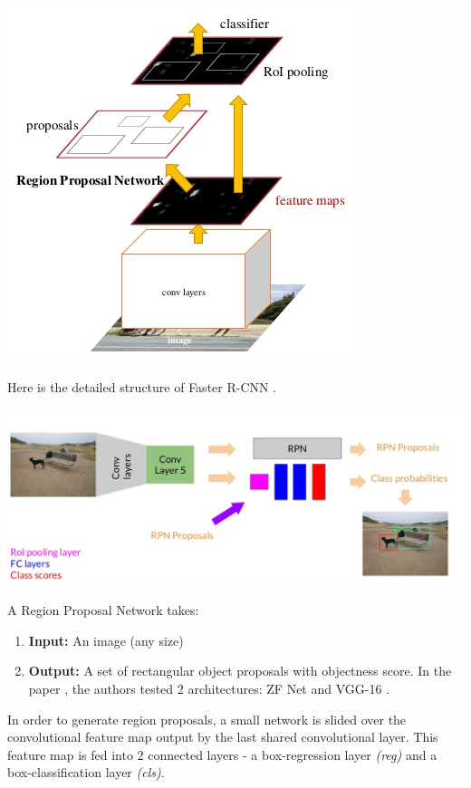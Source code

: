 \documentclass{article}
\begin{document}
\begin{center}
	\includegraphics[scale=0.5]{faster_rcnn}
\end{center}

Here is the detailed structure of Faster R-CNN \cite{slides/faster-rcnn}.

\begin{center}
	\includegraphics[scale=0.3]{faster_rcnn_detail}
\end{center}

A Region Proposal Network takes:
\begin{enumerate}
	\item \textbf{Input:} An image (any size)
	\item \textbf{Output: } A set of rectangular object proposals with objectness score. In the paper \cite{arxiv/faster-rcnn}, the authors tested 2 architectures: ZF Net \cite{arxiv/zfnet} and VGG-16 \cite{arxiv/vgg16}.
\end{enumerate}

In order to generate region proposals, a small network is slided over the convolutional feature map output by the last shared convolutional layer. This feature map is fed into 2 connected layers - a box-regression layer \textit{(reg)} and a box-classification layer \textit{(cls)}.
\end{document}
